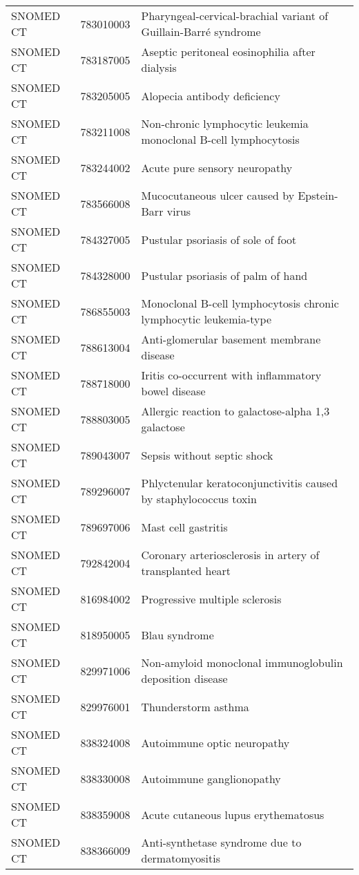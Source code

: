 \begin{longtable}{p{}p{}p{}}
  SNOMED CT & 783010003 & Pharyngeal-cervical-brachial variant of Guillain-Barré syndrome \\ 
  SNOMED CT & 783187005 & Aseptic peritoneal eosinophilia after dialysis \\ 
  SNOMED CT & 783205005 & Alopecia antibody deficiency \\ 
  SNOMED CT & 783211008 & Non-chronic lymphocytic leukemia monoclonal B-cell lymphocytosis \\ 
  SNOMED CT & 783244002 & Acute pure sensory neuropathy \\ 
  SNOMED CT & 783566008 & Mucocutaneous ulcer caused by Epstein-Barr virus \\ 
  SNOMED CT & 784327005 & Pustular psoriasis of sole of foot \\ 
  SNOMED CT & 784328000 & Pustular psoriasis of palm of hand \\ 
  SNOMED CT & 786855003 & Monoclonal B-cell lymphocytosis chronic lymphocytic leukemia-type \\ 
  SNOMED CT & 788613004 & Anti-glomerular basement membrane disease \\ 
  SNOMED CT & 788718000 & Iritis co-occurrent with inflammatory bowel disease \\ 
  SNOMED CT & 788803005 & Allergic reaction to galactose-alpha 1,3 galactose \\ 
  SNOMED CT & 789043007 & Sepsis without septic shock \\ 
  SNOMED CT & 789296007 & Phlyctenular keratoconjunctivitis caused by staphylococcus toxin \\ 
  SNOMED CT & 789697006 & Mast cell gastritis \\ 
  SNOMED CT & 792842004 & Coronary arteriosclerosis in artery of transplanted heart \\ 
  SNOMED CT & 816984002 & Progressive multiple sclerosis \\ 
  SNOMED CT & 818950005 & Blau syndrome \\ 
  SNOMED CT & 829971006 & Non-amyloid monoclonal immunoglobulin deposition disease \\ 
  SNOMED CT & 829976001 & Thunderstorm asthma \\ 
  SNOMED CT & 838324008 & Autoimmune optic neuropathy \\ 
  SNOMED CT & 838330008 & Autoimmune ganglionopathy \\ 
  SNOMED CT & 838359008 & Acute cutaneous lupus erythematosus \\ 
  SNOMED CT & 838366009 & Anti-synthetase syndrome due to dermatomyositis \\ 

\end{longtable}

